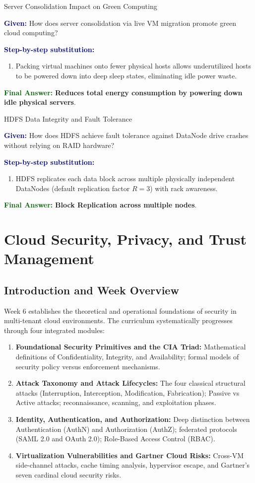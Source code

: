 \documentclass[11pt,a4paper,openany]{report}
\newcommand{\Given}{\par\textbf{\textcolor{navy}{Given:}} }
\newcommand{\Steps}{\par\textbf{\textcolor{navy}{Step-by-step substitution:}}\par}
\newcommand{\Answer}{\par\textbf{\textcolor{darkgreen}{Final Answer:}} }
\begin{document}
\begin{solved}{Server Consolidation Impact on Green Computing}
\Given How does server consolidation via live VM migration promote green cloud computing?
\Steps
\begin{enumerate}[leftmargin=*]
  \item Packing virtual machines onto fewer physical hosts allows underutilized hosts to be powered down into deep sleep states, eliminating idle power waste.
\end{enumerate}
\Answer \textbf{Reduces total energy consumption by powering down idle physical servers}.
\end{solved}

\begin{solved}{HDFS Data Integrity and Fault Tolerance}
\Given How does HDFS achieve fault tolerance against DataNode drive crashes without relying on RAID hardware?
\Steps
\begin{enumerate}[leftmargin=*]
  \item HDFS replicates each data block across multiple physically independent DataNodes (default replication factor $R = 3$) with rack awareness.
\end{enumerate}
\Answer \textbf{Block Replication across multiple nodes}.
\end{solved}

\chapter{Cloud Security, Privacy, and Trust Management}

\section{Introduction and Week Overview}
Week 6 establishes the theoretical and operational foundations of security in multi-tenant cloud environments. The curriculum systematically progresses through four integrated modules:
\begin{enumerate}[leftmargin=*]
  \item \textbf{Foundational Security Primitives and the CIA Triad:} Mathematical definitions of Confidentiality, Integrity, and Availability; formal models of security policy versus enforcement mechanisms.
  \item \textbf{Attack Taxonomy and Attack Lifecycles:} The four classical structural attacks (Interruption, Interception, Modification, Fabrication); Passive vs Active attacks; reconnaissance, scanning, and exploitation phases.
  \item \textbf{Identity, Authentication, and Authorization:} Deep distinction between Authentication (AuthN) and Authorization (AuthZ); federated protocols (SAML 2.0 and OAuth 2.0); Role-Based Access Control (RBAC).
  \item \textbf{Virtualization Vulnerabilities and Gartner Cloud Risks:} Cross-VM side-channel attacks, cache timing analysis, hypervisor escape, and Gartner's seven cardinal cloud security risks.
\end{enumerate}
\end{document}
